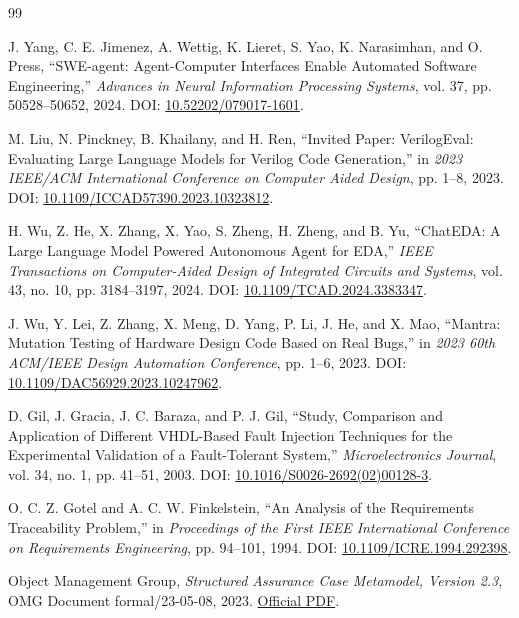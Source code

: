 \documentclass[UTF8,a4paper,zihao=-4,oneside]{ctexart}
\begin{document}
\begingroup
{}
\setlength{\itemsep}{0.25em}
\begin{thebibliography}{99}

J. Yang, C. E. Jimenez, A. Wettig, K. Lieret, S. Yao, K. Narasimhan, and O. Press,
``SWE-agent: Agent-Computer Interfaces Enable Automated Software Engineering,''
\emph{Advances in Neural Information Processing Systems}, vol. 37,
pp. 50528--50652, 2024. DOI: \href{https://doi.org/10.52202/079017-1601}{10.52202/079017-1601}.

M. Liu, N. Pinckney, B. Khailany, and H. Ren,
``Invited Paper: VerilogEval: Evaluating Large Language Models for Verilog Code Generation,''
in \emph{2023 IEEE/ACM International Conference on Computer Aided Design},
pp. 1--8, 2023. DOI: \href{https://doi.org/10.1109/ICCAD57390.2023.10323812}{10.1109/ICCAD57390.2023.10323812}.

H. Wu, Z. He, X. Zhang, X. Yao, S. Zheng, H. Zheng, and B. Yu,
``ChatEDA: A Large Language Model Powered Autonomous Agent for EDA,''
\emph{IEEE Transactions on Computer-Aided Design of Integrated Circuits and Systems},
vol. 43, no. 10, pp. 3184--3197, 2024.
DOI: \href{https://doi.org/10.1109/TCAD.2024.3383347}{10.1109/TCAD.2024.3383347}.

J. Wu, Y. Lei, Z. Zhang, X. Meng, D. Yang, P. Li, J. He, and X. Mao,
``Mantra: Mutation Testing of Hardware Design Code Based on Real Bugs,''
in \emph{2023 60th ACM/IEEE Design Automation Conference}, pp. 1--6, 2023.
DOI: \href{https://doi.org/10.1109/DAC56929.2023.10247962}{10.1109/DAC56929.2023.10247962}.

D. Gil, J. Gracia, J. C. Baraza, and P. J. Gil,
``Study, Comparison and Application of Different VHDL-Based Fault Injection Techniques
for the Experimental Validation of a Fault-Tolerant System,''
\emph{Microelectronics Journal}, vol. 34, no. 1, pp. 41--51, 2003.
DOI: \href{https://doi.org/10.1016/S0026-2692(02)00128-3}{10.1016/S0026-2692(02)00128-3}.

O. C. Z. Gotel and A. C. W. Finkelstein,
``An Analysis of the Requirements Traceability Problem,''
in \emph{Proceedings of the First IEEE International Conference on Requirements Engineering},
pp. 94--101, 1994. DOI: \href{https://doi.org/10.1109/ICRE.1994.292398}{10.1109/ICRE.1994.292398}.

Object Management Group,
\emph{Structured Assurance Case Metamodel, Version 2.3},
OMG Document formal/23-05-08, 2023. \href{https://www.omg.org/spec/SACM/2.3/PDF}{Official PDF}.


\end{thebibliography}
\end{document}
